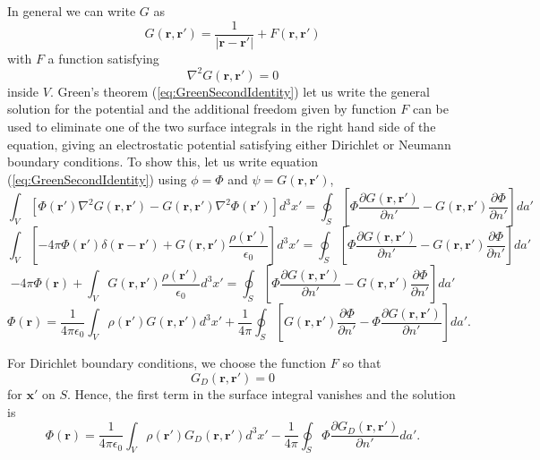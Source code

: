 In general we can write $G$ as
\begin{equation}
G(\textbf{r}, \textbf{r}') = \frac{1}{\left| \textbf{r} - \textbf{r}' \right|} + F(\textbf{r}, \textbf{r}')
\end{equation}
with $F$ a function satisfying 
\begin{equation}
\nabla^2 G(\textbf{r}, \textbf{r}') = 0
\end{equation}
inside $V$. Green's theorem (\ref{eq:GreenSecondIdentity}) let us write the general solution for the potential and the additional freedom given by function $F$ can be used to eliminate one of the two surface integrals in the right hand side of the equation, giving an electrostatic  potential satisfying either Dirichlet or Neumann boundary conditions. To show this, let us write equation (\ref{eq:GreenSecondIdentity}) using $\phi = \Phi$ and $\psi = G(\textbf{r}, \textbf{r}')$,
\begin{equation}
\int_V \left[ \Phi (\textbf{r}') \nabla^2 G(\textbf{r}, \textbf{r}') - G(\textbf{r}, \textbf{r}') \nabla^2 \Phi (\textbf{r}')  \right] d^3x' = \oint_S \left[ \Phi \frac{\partial G(\textbf{r}, \textbf{r}')}{\partial n'} - G(\textbf{r}, \textbf{r}') \frac{\partial \Phi}{\partial n'} \right] da'
\end{equation}
\begin{equation}
\int_V \left[ -4 \pi \Phi (\textbf{r}') \delta (\textbf{r} - \textbf{r}') + G(\textbf{r}, \textbf{r}') \frac{\rho (\textbf{r}')}{\epsilon_0}   \right] d^3x' = \oint_S \left[ \Phi \frac{\partial G(\textbf{r}, \textbf{r}')}{\partial n'} - G(\textbf{r}, \textbf{r}') \frac{\partial \Phi}{\partial n'} \right] da'
\end{equation}
\begin{equation}
 -4 \pi \Phi (\textbf{r}) + \int_V G(\textbf{r}, \textbf{r}') \frac{\rho (\textbf{r}')}{\epsilon_0}  d^3x' = \oint_S \left[ \Phi \frac{\partial G(\textbf{r}, \textbf{r}')}{\partial n'} - G(\textbf{r}, \textbf{r}') \frac{\partial \Phi}{\partial n'} \right] da'
\end{equation}
\begin{equation}
 \Phi (\textbf{r}) = \frac{1}{4 \pi  \epsilon_0} \int_V \rho (\textbf{r}') G(\textbf{r}, \textbf{r}')   d^3x' +\frac{1}{4\pi} \oint_S \left[ G(\textbf{r}, \textbf{r}') \frac{\partial \Phi}{\partial n'} - \Phi \frac{\partial G(\textbf{r}, \textbf{r}')}{\partial n'}  \right] da'. 
\end{equation}

For Dirichlet boundary conditions, we choose the function $F$ so that
\begin{equation}
G_D (\textbf{r}, \textbf{r}') = 0 
\end{equation}
for $\textbf{x}'$ on $S$. Hence, the first term in the surface integral vanishes and the solution is 
\begin{equation}
 \Phi (\textbf{r}) = \frac{1}{4 \pi  \epsilon_0} \int_V \rho (\textbf{r}') G_D (\textbf{r}, \textbf{r}')  d^3x' -\frac{1}{4\pi} \oint_S   \Phi \frac{\partial G _D (\textbf{r}, \textbf{r}')}{\partial n'}  da'. 
\end{equation}


